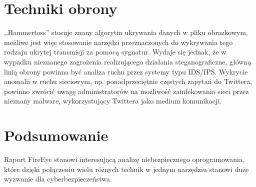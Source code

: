 \documentclass{eiti-raport}
\begin{document}
\begin{multicols*}{2}
\section{Techniki obrony}
,,Hammertoss'' stosuje znany algorytm ukrywania danych w pliku obrazkowym, możliwe jest więc stosowanie narzędzi przeznaczonych do wykrywania tego rodzaju ukrytej transmisji za pomocą sygnatur. Wydaje się jednak, że w wypadku nieznanego zagrożenia realizującego działania steganograficzne, główną linią obrony powinna być analiza ruchu przez systemy typu IDS/IPS. Wykrycie anomalii w ruchu sieciowym, np. ponadprzeciętnie częstych zapytań do Twittera, powinno zwrócić uwagę administratorów na możliwość zainfekowania sieci przez nieznany malware, wykorzystujący Twittera jako medium komunikacji.

\section{Podsumowanie} \label{sec:summary}
Raport FireEye stanowi interesującą analizę niebezpiecznego oprogramowania, które dzięki połączeniu wielu różnych technik w jednym narzędziu stanowi duże wyzwanie dla cyberbezpieczeństwa. 


\end{multicols*}
\end{document}
